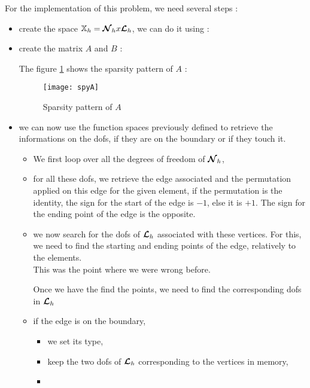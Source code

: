 For the implementation of this problem, we need several steps :
\begin{itemize}
\item
  create the space $\mathbb{X}_h={\bm{\mathcal{N}}}_hx{\bm{\mathcal{L}}}_h$, we can do it using :
  
\item
  create the matrix $A$ and $B$ :
  
  The figure \ref{spyA} shows the sparsity pattern of $A$ : 
  \begin{figure}[H]
    \centering
    \texttt{[image: spyA]}
    \caption{Sparsity pattern of $A$}
    \label{spyA}
  \end{figure}
\item
  we can now use the function spaces previously defined to retrieve the
  informations on the dofs, if they are on the boundary or if they touch it.\\
  \begin{itemize}
  \item
    We first loop over all the degrees of freedom of ${\bm{\mathcal{N}}}_h$,
    
  \item
    for all these dofs, we retrieve the edge associated and the permutation applied on this edge for the given element, if the permutation is the identity, the sign for the start of the edge is $-1$, else it is $+1$. The sign for the ending point of the edge is the opposite.
    
  \item
    we now search for the dofs of ${\bm{\mathcal{L}}}_h$ associated with these vertices. For this, we need to find the starting and ending points of the edge, relatively to the elements.\\
    This was the point where we were wrong before.
    
    Once we have the find the points, we need to find the corresponding dofs in ${\bm{\mathcal{L}}}_h$
    
  \item
    if the edge is on the boundary,
    \begin{itemize}
    \item
      we set its type,
    \item
      keep the two dofs of ${\bm{\mathcal{L}}}_h$ corresponding to the vertices in memory,
    \item

\end{itemize}
\end{itemize}
\end{itemize}
